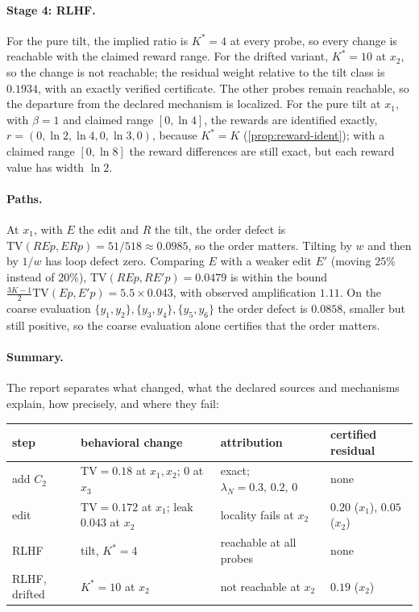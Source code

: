 \documentclass[11pt]{article}
\theoremstyle{definition}
\theoremstyle{remark}
\newcommand{\TV}{\mathrm{TV}}
\begin{document}
\paragraph{Stage 4: RLHF.} For the pure tilt, the implied ratio is $K^*=4$ at every probe, so every
change is reachable with the claimed reward range. For the drifted variant, $K^*=10$ at $x_2$, so the
change is not reachable; the residual weight relative to the tilt class is $0.1934$, with an exactly
verified certificate. The other probes remain reachable, so the departure from the declared mechanism
is localized. For the pure tilt at $x_1$, with $\beta=1$ and claimed range $[0,\ln4]$, the rewards are
identified exactly, $r=(0,\ln2,\ln4,0,\ln3,0)$, because $K^*=K$ (\cref{prop:reward-ident}); with a
claimed range $[0,\ln8]$ the reward differences are still exact, but each reward value has width
$\ln2$.

\paragraph{Paths.} At $x_1$, with $E$ the edit and $R$ the tilt, the order defect is
$\TV(REp,ERp)=51/518\approx0.0985$, so the order matters. Tilting by $w$ and then by $1/w$ has loop defect
zero. Comparing $E$ with a weaker edit $E'$ (moving $25\%$ instead of $20\%$),
$\TV(REp,RE'p)=0.0479$ is within the bound $\tfrac{3K-1}2\TV(Ep,E'p)=5.5\times0.043$, with observed
amplification $1.11$. On the coarse evaluation $\{y_1,y_2\},\{y_3,y_4\},\{y_5,y_6\}$ the order defect is
$0.0858$, smaller but still positive, so the coarse evaluation alone certifies that the order matters.

\paragraph{Summary.} The report separates what changed, what the declared sources and mechanisms
explain, how precisely, and where they fail:
\begin{center}\small
\begin{tabular}{@{}llll@{}}
\toprule
step & behavioral change & attribution & certified residual\\
\midrule
add $C_2$ & $\TV=0.18$ at $x_1,x_2$; $0$ at $x_3$ & exact; $\lambda_N=0.3,\,0.2,\,0$ & none\\
edit & $\TV=0.172$ at $x_1$; leak $0.043$ at $x_2$ & locality fails at $x_2$ & $0.20$ ($x_1$), $0.05$ ($x_2$)\\
RLHF & tilt, $K^*=4$ & reachable at all probes & none\\
RLHF, drifted & $K^*=10$ at $x_2$ & not reachable at $x_2$ & $0.19$ ($x_2$)\\
\bottomrule
\end{tabular}
\end{center}
\end{document}
